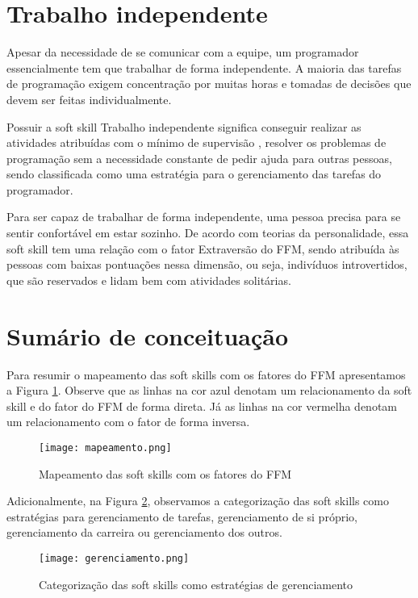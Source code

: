 \section{Trabalho independente}

Apesar da necessidade de se comunicar com a equipe, um programador essencialmente tem que trabalhar de forma independente. A maioria das tarefas de programação exigem concentração por muitas horas e tomadas de decisões que devem ser feitas individualmente.

Possuir a soft skill Trabalho independente significa conseguir realizar as atividades atribuídas com o mínimo de supervisão \cite{ahmed:12}, resolver os problemas de programação sem a necessidade constante de pedir ajuda para outras pessoas, sendo classificada como uma estratégia para o gerenciamento das tarefas do programador.

Para ser capaz de trabalhar de forma independente, uma pessoa precisa para se sentir confortável em estar sozinho. De acordo com teorias da personalidade, essa soft skill tem uma relação com o fator Extraversão do FFM\cite{rehman:12}, sendo atribuída às pessoas com baixas pontuações nessa dimensão, ou seja, indivíduos introvertidos, que são reservados e lidam bem com atividades solitárias.

\section{Sumário de conceituação}

Para resumir o mapeamento das soft skills com os fatores do FFM apresentamos a Figura \ref{fig:mapeamento}. Observe que as linhas na cor azul denotam um relacionamento da soft skill e do fator do FFM de forma direta. Já as linhas na cor vermelha denotam um relacionamento com o fator de forma inversa.

\begin{figure}[h*]
\centering
\caption{\small Mapeamento das soft skills com os fatores do FFM} 
\texttt{[image: mapeamento.png]}
\label{fig:mapeamento}
\end{figure}

Adicionalmente, na Figura \ref{fig:gerenciamento}, observamos a categorização das soft skills como estratégias para gerenciamento de tarefas, gerenciamento de si próprio, gerenciamento da carreira ou gerenciamento dos outros.

\begin{figure}[h*]
\centering
\caption{\small Categorização das soft skills como estratégias de gerenciamento} %
\texttt{[image: gerenciamento.png]}
\label{fig:gerenciamento}
\end{figure}